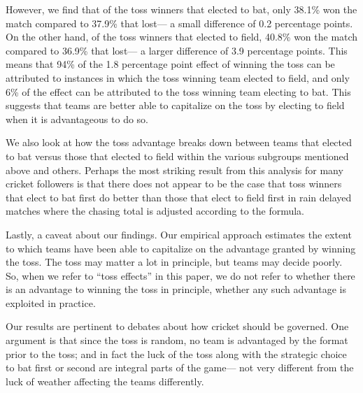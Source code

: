 \documentclass[11pt,  letterpaper]{article}
\begin{document}
However, we find that of the toss winners that elected to bat, only 38.1\% won the match compared to 37.9\% that lost--- a small difference of 0.2 percentage points. On the other hand, of the toss winners that elected to field, 40.8\% won the match compared to 36.9\% that lost--- a larger difference of 3.9 percentage points. This means that 94\% of the 1.8 percentage point effect of winning the toss can be attributed to instances in which the toss winning team elected to field, and only 6\% of the effect can be attributed to the toss winning team electing to bat. This suggests that teams are better able to capitalize on the toss by electing to field when it is advantageous to do so. 

We also look at how the toss advantage breaks down between teams that elected to bat versus those that elected to field within the various subgroups mentioned above and others. Perhaps the most striking result from this analysis for many cricket followers is that there does not appear to be the case that toss winners that elect to bat first do better than those that elect to field first in rain delayed matches where the chasing total is adjusted according to the \citet{duckworth1998} formula. 

Lastly, a caveat about our findings. Our empirical approach estimates the extent to which teams have been able to capitalize on the advantage granted by winning the toss. The toss may matter a lot in principle, but teams may decide poorly. So, when we refer to ``toss effects'' in this paper, we do not refer to whether there is an advantage to winning the toss in principle, whether any such advantage is exploited in practice.

Our results are pertinent to debates about how cricket should be governed. One argument is that since the toss is random, no team is advantaged by the format prior to the toss; and in fact the luck of the toss along with the strategic choice to bat first or second are integral parts of the game--- not very different from the luck of weather affecting the teams differently. 
\end{document}

